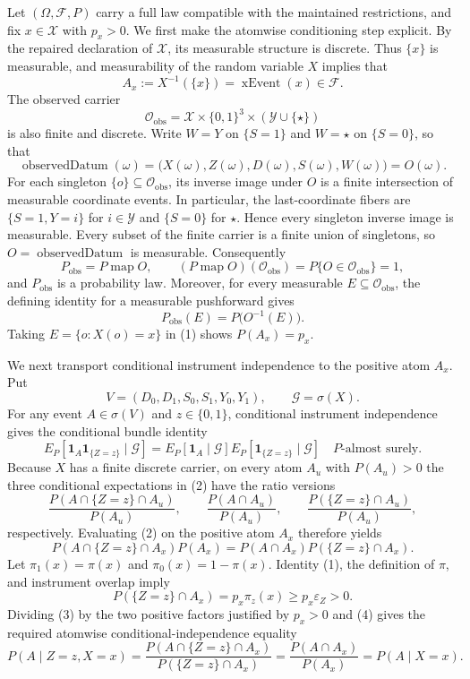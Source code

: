Let \((\Omega,\mathscr F,P)\) carry a full law compatible with the maintained restrictions, and fix \(x\in\mathcal X\) with \(p_x>0\).  We first make the atomwise conditioning step explicit.  By the repaired declaration of \(\mathcal X\), its measurable structure is discrete.  Thus \(\{x\}\) is measurable, and measurability of the random variable \(X\) implies that
\[
A_x:=X^{-1}(\{x\})=\operatorname{xEvent}(x)\in\mathscr F.
\]
The observed carrier
\[
\mathcal O_{\mathrm{obs}}
=\mathcal X\times\{0,1\}^{3}\times(\mathcal Y\cup\{\star\})
\]
is also finite and discrete.  Write \(W=Y\) on \(\{S=1\}\) and \(W=\star\) on \(\{S=0\}\), so that
\[
\operatorname{observedDatum}(\omega)
=\bigl(X(\omega),Z(\omega),D(\omega),S(\omega),W(\omega)\bigr)
=O(\omega).
\]
For each singleton \(\{o\}\subseteq\mathcal O_{\mathrm{obs}}\), its inverse image under \(O\) is a finite intersection of measurable coordinate events.  In particular, the last-coordinate fibers are \(\{S=1,Y=i\}\) for \(i\in\mathcal Y\) and \(\{S=0\}\) for \(\star\).  Hence every singleton inverse image is measurable.  Every subset of the finite carrier is a finite union of singletons, so \(O=\operatorname{observedDatum}\) is measurable.  Consequently
\[
P_{\mathrm{obs}}=P\mathbin{\operatorname{map}}O,
\qquad
(P\mathbin{\operatorname{map}}O)(\mathcal O_{\mathrm{obs}})
=P\{O\in\mathcal O_{\mathrm{obs}}\}=1,
\]
and \(P_{\mathrm{obs}}\) is a probability law.  Moreover, for every measurable \(E\subseteq\mathcal O_{\mathrm{obs}}\), the defining identity for a measurable pushforward gives
\[
P_{\mathrm{obs}}(E)=P\bigl(O^{-1}(E)\bigr).
\tag{1}
\]
Taking \(E=\{o:X(o)=x\}\) in (1) shows \(P(A_x)=p_x\).

We next transport conditional instrument independence to the positive atom \(A_x\).  Put
\[
V=(D_0,D_1,S_0,S_1,Y_0,Y_1),
\qquad \mathscr G=\sigma(X).
\]
For any event \(A\in\sigma(V)\) and \(z\in\{0,1\}\), conditional instrument independence gives the conditional bundle identity
\[
E_P\!\left[\mathbf 1_A\mathbf 1_{\{Z=z\}}\mid\mathscr G\right]
=E_P\!\left[\mathbf 1_A\mid\mathscr G\right]
 E_P\!\left[\mathbf 1_{\{Z=z\}}\mid\mathscr G\right]
\quad P\text{-almost surely}.
\tag{2}
\]
Because \(X\) has a finite discrete carrier, on every atom \(A_u\) with \(P(A_u)>0\) the three conditional expectations in (2) have the ratio versions
\[
\frac{P(A\cap\{Z=z\}\cap A_u)}{P(A_u)},
\qquad
\frac{P(A\cap A_u)}{P(A_u)},
\qquad
\frac{P(\{Z=z\}\cap A_u)}{P(A_u)},
\]
respectively.  Evaluating (2) on the positive atom \(A_x\) therefore yields
\[
P(A\cap\{Z=z\}\cap A_x)P(A_x)
=P(A\cap A_x)P(\{Z=z\}\cap A_x).
\tag{3}
\]
Let \(\pi_1(x)=\pi(x)\) and \(\pi_0(x)=1-\pi(x)\).  Identity (1), the definition of \(\pi\), and instrument overlap imply
\[
P(\{Z=z\}\cap A_x)=p_x\pi_z(x)
\ge p_x\varepsilon_Z>0.
\tag{4}
\]
Dividing (3) by the two positive factors justified by \(p_x>0\) and (4) gives the required atomwise conditional-independence equality
\[
P(A\mid Z=z,X=x)
=\frac{P(A\cap\{Z=z\}\cap A_x)}{P(\{Z=z\}\cap A_x)}
=\frac{P(A\cap A_x)}{P(A_x)}
=P(A\mid X=x).
\tag{5}
\]

